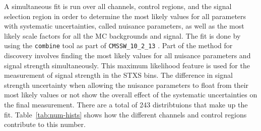 A simultaneous fit is run over all channels, control regions, and the signal selection region
in order to determine the most likely values for all
parameters with systematic uncertainties, called nuisance parameters,
as well as the most likely scale factors for all the MC backgrounds and signal.
The fit is done by using the \texttt{combine} tool \cite{cmsdocumentation} as part of
\texttt{CMSSW\_10\_2\_13} \cite{cmssw_doxygen}.
Part of the method for discovery involves finding the most likely values
for all nuisance parameters and signal strength simultaneously.
This maximum likelihood feature is used for the measurement of signal strength in the STXS bins.
The difference in signal strength uncertainty when allowing the nuisance parameters to float
from their most likely values or not show the overall effect of the systematic uncertainties
on the final measurement.
There are a total of 243 distribtuions that make up the fit.
Table~\ref{tab:num-hists} shows how the different channels and control regions contribute to this number.
%
